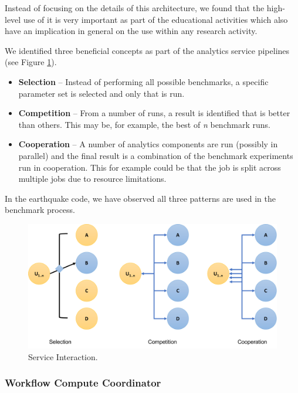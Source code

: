\documentclass[utf8]{FrontiersinVancouver} %
\begin{document}
Instead of focusing on the details of this architecture, we found that
the high-level use of it is very important as part of the educational
activities which also have an implication in general on the use within
any research activity.

We identified three beneficial concepts as part of the analytics 
service pipelines (see Figure \ref{fig:service-interaction}).

\begin{itemize}
\item {\bf Selection} -- Instead of performing all possible benchmarks,
  a specific parameter set is selected and only that is run.
\item {\bf Competition} -- From a number of runs, a result is
  identified that is better than others. This may be, for example, the
  best of {\em n} benchmark runs.
\item {\bf Cooperation} -- A number of analytics components are run
  (possibly in parallel) and the final result is a combination of the
  benchmark experiments run in cooperation. This for example could be
  that the job is split across multiple jobs due to resource
  limitations.
\end{itemize}

In the earthquake code, we have observed all three patterns are used
in the benchmark process.

\begin{figure}[htb]
\centering\includegraphics[width=0.75\columnwidth]{images/processes-nist}
\caption{Service Interaction.}
\label{fig:service-interaction}
\end{figure}




\subsubsection{Workflow Compute Coordinator}
\label{sec:workflow-cc}

\end{document}
